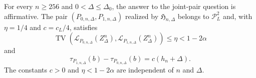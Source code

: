 For every \(n\geq256\) and \(0<\Delta\leq\Delta_0\), the answer to the joint-pair question is affirmative.  The pair \((P_{0,n,\Delta},P_{1,n,\Delta})\) realized by \(\mathfrak H_{n,\Delta}\) belongs to \(\mathcal P_L^2\) and, with \(\eta=1/4\) and \(c=c_L/4\), satisfies
\[
 \operatorname{TV}\!\left(\mathcal L_{P_{0,n,\Delta}}(Z_\Delta^n),
 \mathcal L_{P_{1,n,\Delta}}(Z_\Delta^n)\right)\leq\eta<1-2\alpha
\]
and
\[
 \tau_{P_{1,n,\Delta}}(b)-\tau_{P_{0,n,\Delta}}(b)
 =c(h_n+\Delta).
\]
The constants \(c>0\) and \(\eta<1-2\alpha\) are independent of \(n\) and \(\Delta\).